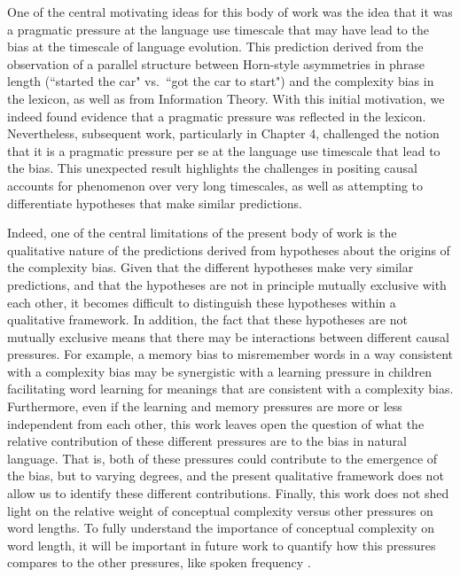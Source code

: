 One of the central motivating ideas for this body of work was the idea that it was a pragmatic pressure at the language use timescale that may have lead to the bias at the timescale of language evolution. This prediction derived from the observation of a parallel structure between Horn-style asymmetries in phrase length (``started the car" vs.\ ``got the car to start") and the complexity bias in the lexicon, as well as from Information Theory. With this initial motivation, we indeed found evidence that a pragmatic pressure was reflected in the lexicon. Nevertheless, subsequent work, particularly in Chapter 4, challenged the notion that it is a pragmatic pressure  per se at the language use timescale that lead to the bias. This unexpected result highlights the challenges in positing causal accounts for phenomenon over very long timescales, as well as attempting to differentiate hypotheses that make  similar predictions.

Indeed, one of the central limitations of the present body of work is the qualitative nature of the predictions derived from  hypotheses about the origins of the complexity bias. Given that the different hypotheses make very similar predictions, and that the hypotheses are not in principle mutually exclusive with each other, it becomes difficult to distinguish these hypotheses within a qualitative framework. In addition, the fact that these hypotheses are not mutually exclusive means that there may be interactions between different causal pressures. For example, a memory bias to misremember words in a way consistent with a complexity bias may be synergistic with a learning pressure in children facilitating word learning for meanings that are consistent with a complexity bias. Furthermore, even if the learning and memory pressures are more or less independent from each other, this work leaves open the question of what the relative contribution of these different pressures are to the bias in natural language. That is, both of these pressures could contribute to the emergence of the bias, but to varying degrees, and the present qualitative framework does not allow us to identify these different contributions. Finally, this work does not shed light on the relative weight of conceptual complexity versus other pressures on word lengths. To fully understand the importance of conceptual complexity on word length, it will be important in future work to quantify how this pressures compares to the other pressures, like spoken frequency \cite{zipf}. 

